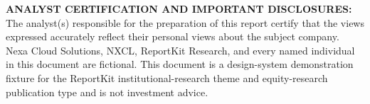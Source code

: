 \documentclass[theme=institutional-research,publication-type=equity-research]{reportkit}
\begin{document}
\vfill
{\rkdisclosuresize\color{Muted}\textbf{ANALYST CERTIFICATION AND IMPORTANT DISCLOSURES:} The analyst(s) responsible for the preparation of this report certify that the views expressed accurately reflect their personal views about the subject company. Nexa Cloud Solutions, NXCL, ReportKit Research, and every named individual in this document are fictional. This document is a design-system demonstration fixture for the ReportKit institutional-research theme and equity-research publication type and is not investment advice.\par}
\end{document}
